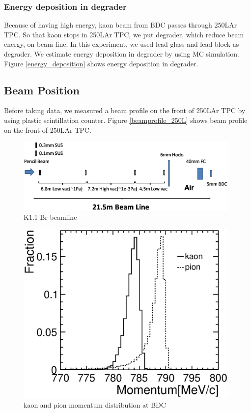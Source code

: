    \subsubsection{Energy deposition in degrader}
   Because of having high energy, kaon beam from BDC passes through 250LAr TPC.
   So that kaon stops in 250LAr TPC, we put degrader, which reduce
   beam energy, on beam line.
   In this experiment, we used lead glass and lead block as degrader.
   We estimate energy deposition in degrader by using MC simulation.
   Figure \ref{energy_deposition} shows energy deposition in degrader.
   
   \subsection{Beam Position}
   Before taking data, we measured a beam profile on the front of
   250LAr TPC by using plastic scintillation counter.
   Figure \ref{beamprofile_250L} shows beam profile on the front of
   250LAr TPC.

   \begin{figure}[!htb]
    \centering
    \centering
    \includegraphics[width=11cm,clip]{./fig/K11Br_beamline_sim.eps}
    \caption{K1.1 Br beamline}
    \label{K11Br_Beam_line}
   \end{figure}



   \begin{figure}[!htb]
    \centering
    \centering
    \includegraphics[width=11cm,clip]{./fig/Kaon_pion_momentum_nogrid.eps}
    \caption{kaon and pion momentum distribution at BDC}
    \label{k_pi_momentum}
   \end{figure}


